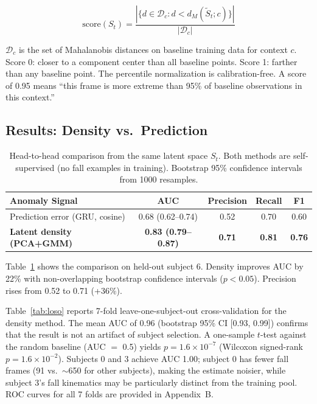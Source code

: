 \documentclass[11pt,a4paper]{article}
\begin{document}
\begin{equation}
\text{score}(S_t) = \frac{|\{d \in \mathcal{D}_c : d < d_M(\tilde{S}_t; c)\}|}{|\mathcal{D}_c|}
\end{equation}

$\mathcal{D}_c$ is the set of Mahalanobis distances on baseline training data for context $c$.
Score 0: closer to a component center than all baseline points. Score 1: farther than any baseline point.
The percentile normalization is calibration-free. A score of 0.95 means ``this frame is more extreme than 95\% of baseline observations in this context.''

\subsection{Results: Density vs.\ Prediction}

\begin{table}[H]
\centering
\caption{Head-to-head comparison from the same latent space $S_t$. Both methods are self-supervised (no fall examples in training). Bootstrap 95\% confidence intervals from 1000 resamples.}
\label{tab:head_to_head}
\begin{tabular}{lcccc}
\toprule
\textbf{Anomaly Signal} & \textbf{AUC} & \textbf{Precision} & \textbf{Recall} & \textbf{F1} \\
\midrule
Prediction error (GRU, cosine)       & 0.68 (0.62--0.74) & 0.52 & 0.70 & 0.60 \\
\textbf{Latent density (PCA+GMM)}    & \textbf{0.83 (0.79--0.87)} & \textbf{0.71} & \textbf{0.81} & \textbf{0.76} \\
\bottomrule
\end{tabular}
\end{table}

Table~\ref{tab:head_to_head} shows the comparison on held-out subject 6.
Density improves AUC by 22\% with non-overlapping bootstrap confidence intervals ($p < 0.05$).
Precision rises from 0.52 to 0.71 (+36\%).

Table~\ref{tab:loso} reports 7-fold leave-one-subject-out cross-validation for the density method.
The mean AUC of 0.96 (bootstrap 95\% CI [0.93, 0.99]) confirms that the result is not an artifact of subject selection.
A one-sample $t$-test against the random baseline (AUC $=$ 0.5) yields $p = 1.6{\times}10^{-7}$ (Wilcoxon signed-rank $p = 1.6{\times}10^{-2}$).
Subjects 0 and 3 achieve AUC 1.00; subject 0 has fewer fall frames (91 vs.\ $\sim$650 for other subjects), making the estimate noisier, while subject 3's fall kinematics may be particularly distinct from the training pool.
ROC curves for all 7 folds are provided in Appendix~B.
\end{document}
